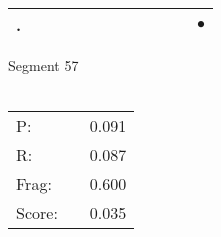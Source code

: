 \documentclass[landscape]{article}
\newcommand{\ssp}{\hspace{2pt}}
\newcommand{\mex}{\cellcolor{g}$\bullet$}
\begin{document}
\begin{tabular}{|l|p{10pt}|p{10pt}|p{10pt}|p{10pt}|p{10pt}|p{10pt}|p{10pt}|p{10pt}|p{10pt}|p{10pt}|p{10pt}|}
\hline
\ssp \cellcolor{ref10}. \ssp&\hspace{2pt}&\hspace{2pt}&\hspace{2pt}&\hspace{2pt}&\hspace{2pt}&\hspace{2pt}&\hspace{2pt}&\hspace{2pt}&\hspace{2pt}&\hspace{2pt}&\hspace{2pt}\mex\\
\hline
\end{tabular}

\vspace{6pt}
\noindent Segment 57\\\\
\noindent\begin{tabular}{lm{12pt}r}
\hline
P:&&0.091\\
R:&&0.087\\
Frag:&&0.600\\
Score:&&0.035\\
\end{tabular}

\newpage
\end{document}
